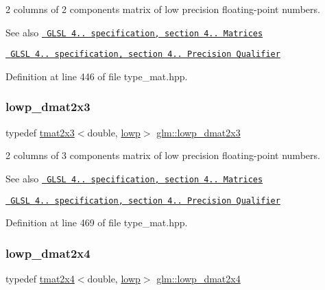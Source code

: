 2 columns of 2 components matrix of low precision floating-\/point numbers.

\begin{DoxySeeAlso}{See also}
\href{http://www.opengl.org/registry/doc/GLSLangSpec.4.20.8.pdf}{\texttt{ G\+L\+SL 4.. specification, section 4.. Matrices}} 

\href{http://www.opengl.org/registry/doc/GLSLangSpec.4.20.8.pdf}{\texttt{ G\+L\+SL 4.. specification, section 4.. Precision Qualifier}} 
\end{DoxySeeAlso}


Definition at line 446 of file type\+\_\+mat.\+hpp.

\mbox{\label{group__core__precision_gada78eb998a9c716aedee01501456b94d}} 
\subsubsection{\texorpdfstring{lowp\_dmat2x3}{lowp\_dmat2x3}}
{\footnotesize\ttfamily typedef \mbox{\hyperlink{structglm_1_1tmat2x3}{tmat2x3}}$<$double, \mbox{\hyperlink{namespaceglm_a0f04f086094c747d227af4425893f545ae161af3fc695e696ce3bf69f7332bc2d}{lowp}}$>$ \mbox{\hyperlink{group__core__precision_gada78eb998a9c716aedee01501456b94d}{glm\+::lowp\+\_\+dmat2x3}}}

2 columns of 3 components matrix of low precision floating-\/point numbers.

\begin{DoxySeeAlso}{See also}
\href{http://www.opengl.org/registry/doc/GLSLangSpec.4.20.8.pdf}{\texttt{ G\+L\+SL 4.. specification, section 4.. Matrices}} 

\href{http://www.opengl.org/registry/doc/GLSLangSpec.4.20.8.pdf}{\texttt{ G\+L\+SL 4.. specification, section 4.. Precision Qualifier}} 
\end{DoxySeeAlso}


Definition at line 469 of file type\+\_\+mat.\+hpp.

\mbox{\label{group__core__precision_ga2aee5f52e32f0adcfdeb3142b50cb660}} 
\subsubsection{\texorpdfstring{lowp\_dmat2x4}{lowp\_dmat2x4}}
{\footnotesize\ttfamily typedef \mbox{\hyperlink{structglm_1_1tmat2x4}{tmat2x4}}$<$double, \mbox{\hyperlink{namespaceglm_a0f04f086094c747d227af4425893f545ae161af3fc695e696ce3bf69f7332bc2d}{lowp}}$>$ \mbox{\hyperlink{group__core__precision_ga2aee5f52e32f0adcfdeb3142b50cb660}{glm\+::lowp\+\_\+dmat2x4}}}

